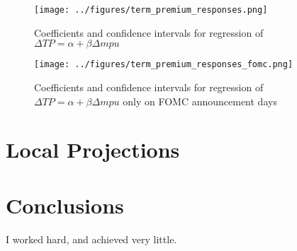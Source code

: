 \documentclass[11pt]{article}
\begin{document}
\begin{figure}
	\centering
	\texttt{[image: ../figures/term\_premium\_responses.png]}
	\caption{Coefficients and confidence intervals for regression of $\Delta TP = \alpha + \beta \Delta mpu$}
	\label{fig:term_premium_responses}
\end{figure}

\begin{figure}
	\centering
	\texttt{[image: ../figures/term\_premium\_responses\_fomc.png]}
	\caption{Coefficients and confidence intervals for regression of $\Delta TP = \alpha + \beta \Delta mpu$ only on FOMC announcement days}
	\label{fig:term_premium_responses_fomc}
\end{figure}
\section{Local Projections}
\section{Conclusions}\label{conclusions}
I worked hard, and achieved very little.
\end{document}
